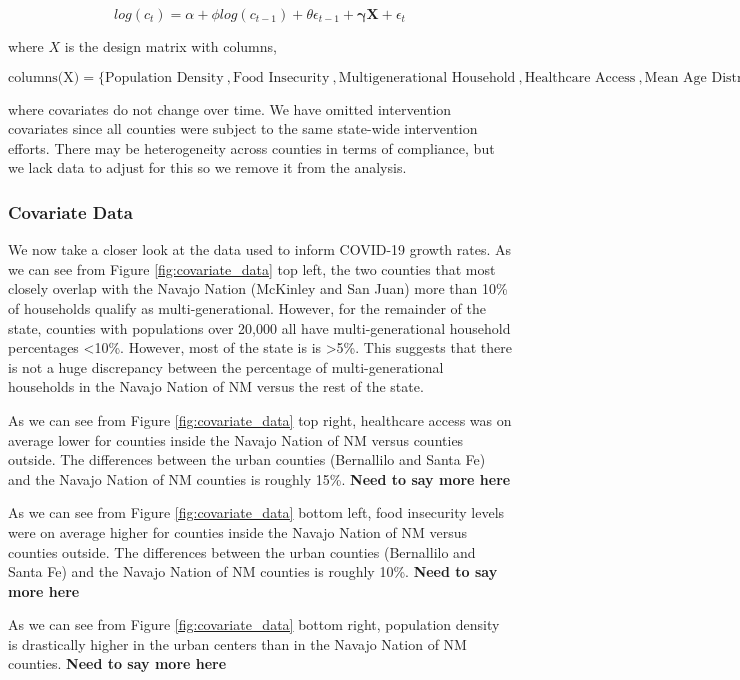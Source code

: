 \documentclass{article}
\begin{document}
{\begin{equation}
 log(c_t) = \alpha + \phi log(c_{t-1}) + \theta\epsilon_{t-1} + \bm{\gamma} \bm{X} + \epsilon_t
 \end{equation}

where $X$ is the design matrix with columns,

$$\text{columns(X)} = \{\text{Population Density}  \ , \text{Food Insecurity} \ ,  \text{Multigenerational Household} \ , \text{Healthcare Access} \ , \text{Mean Age Distribution}\}$$


where covariates do not change over time. We have omitted intervention covariates since all counties were subject to the same state-wide intervention efforts. There may be heterogeneity across counties in terms of compliance, but we lack data to adjust for this so we remove it from the analysis. 

\subsubsection{Covariate Data}

We now take a closer look at the data used to inform COVID-19 growth rates. As we can see from Figure \ref{fig:covariate_data} top left, the two counties that most closely overlap with the Navajo Nation (McKinley and San Juan) more than 10\% of households qualify as multi-generational. However, for the remainder of the state, counties with populations over 20,000 all have multi-generational household percentages <10\%. However, most of the state is is >5\%. This suggests that there is not a huge discrepancy between the percentage of multi-generational households in the Navajo Nation of NM versus the rest of the state.  

As we can see from Figure \ref{fig:covariate_data} top right, healthcare access was on average lower for counties inside the Navajo Nation of NM versus counties outside. The differences between the urban counties (Bernallilo and Santa Fe) and the Navajo Nation of NM counties is roughly 15\%. \textbf{Need to say more here}

As we can see from Figure \ref{fig:covariate_data} bottom left, food insecurity levels were on average higher for counties inside the Navajo Nation of NM versus counties outside. The differences between the urban counties (Bernallilo and Santa Fe) and the Navajo Nation of NM counties is roughly 10\%. \textbf{Need to say more here}

As we can see from Figure \ref{fig:covariate_data} bottom right, population density is drastically higher in the urban centers than in the Navajo Nation of NM counties.  \textbf{Need to say more here}

}
\end{document}
